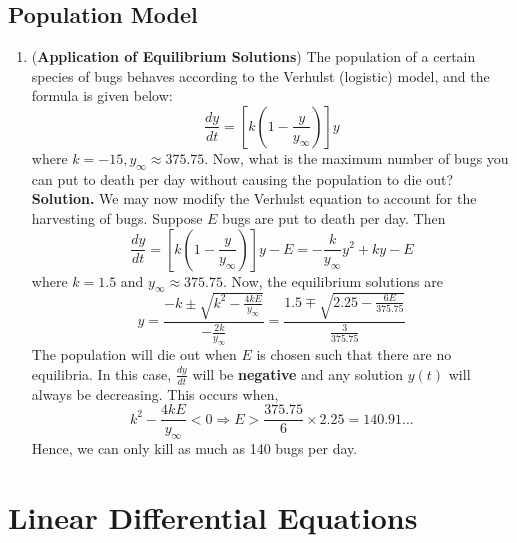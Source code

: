 \documentclass{article}
\begin{document}
\subsection{Population Model}
\begin{enumerate}
    \item (\textbf{Application of Equilibrium Solutions}) The population of a certain species of bugs behaves according to the Verhulst (logistic) model, and the formula is given below:
    \begin{equation}
        \frac{dy}{dt}=[k(1-\frac{y}{y_\infty})]y
    \end{equation}
    where $k=-15, y_{\infty}\approx375.75$. Now, what is the maximum number of bugs you can put to death per day without causing the population to die out? \newline
    \textbf{Solution.} We may now modify the Verhulst equation to account for the harvesting of bugs. Suppose $E$ bugs are put to death per day. Then
    \begin{equation*}
        \frac{dy}{dt}=[k(1-\frac{y}{y_{\infty}})]y-E=-\frac{k}{y_\infty}y^2+ky-E
    \end{equation*}
    where $k=1.5$ and $y_\infty\approx375.75$. Now, the equilibrium solutions are
    \begin{equation*}
        y=\frac{-k\pm\sqrt{k^2-\frac{4kE}{y_\infty}}}{-\frac{2k}{y_\infty}}=\frac{1.5\mp\sqrt{2.25-\frac{6E}{375.75}}}{\frac{3}{375.75}}
    \end{equation*}
    The population will die out when $E$ is chosen such that there are no equilibria. In this case, $\frac{dy}{dt}$ will be \textbf{negative} and any solution $y(t)$ will always be decreasing. This occurs when,
    \begin{equation*}
        k^2-\frac{4kE}{y_\infty}<0\Rightarrow E>\frac{375.75}{6}\times2.25=140.91\dots
    \end{equation*}
    Hence, we can only kill as much as 140 bugs per day.
\end{enumerate}
\newpage
\section{Linear Differential Equations}
\end{document}
